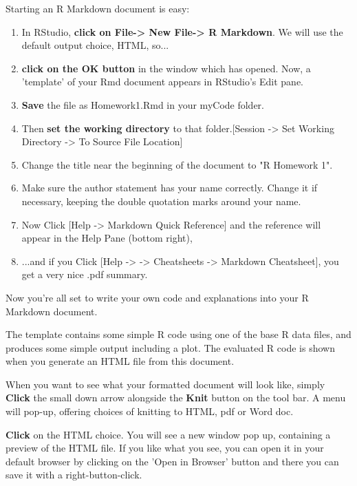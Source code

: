 \documentclass[titlepage]{book}\usepackage{knitr}
\begin{document}
Starting an R Markdown document is easy:

\begin{enumerate}
\item{In RStudio, \textbf{click on File-> New File-> R Markdown}. We will use the default output choice, HTML, so...}

\item{\textbf{click on the OK button} in the window which has opened. Now, a 'template' of your Rmd document appears in RStudio's Edit pane.}

\item{\textbf{Save} the file as Homework1.Rmd in your myCode folder.}

\item{Then \textbf{set the working directory} to that folder.[Session -> Set Working Directory -> To Source File Location]}


\item{Change the title near the beginning of the document to "R Homework 1".}

\item{Make sure the author statement has your name correctly. Change it if necessary, keeping the double quotation marks around your name.}

\item{Now Click [Help -> Markdown Quick Reference] and the reference will appear in the Help Pane (bottom right),}
\item{...and if you Click [Help -> -> Cheatsheets -> Markdown Cheatsheet], you get a very nice .pdf summary. }

\end{enumerate}

Now you're all set to write your own code and explanations into your R Markdown document.

The template contains some simple R code using one of the base R data files, and produces some simple output including a plot. The evaluated R code is shown when you generate an HTML file from this document.

When you want to see what your formatted document will look like, simply \textbf{Click} the small down arrow alongside the \textbf{Knit} button on the tool bar. A menu will pop-up, offering choices of knitting to HTML, pdf or Word doc.  

\textbf{Click} on the HTML choice. You will see a new window pop up, containing a preview of the HTML file. If you like what you see, you can open it in your default browser by clicking on the 'Open in Browser' button and there you can save it with a right-button-click.
\end{document}
